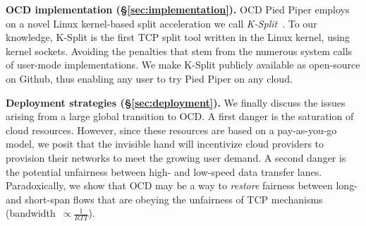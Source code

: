 \documentclass[newfonts=false,format=sigconf,anonymous,10pt,letterpaper]{acmart}
\newcommand{\T}[1]{\smallskip\noindent\textbf{#1}} %
\newcommand{\name}{Pied Piper\xspace}
\newcommand{\ksplit}{K-Split\xspace}
\begin{document}
\T{OCD implementation (\S\ref{sec:implementation}).} OCD \name employs on a novel Linux kernel-based split acceleration we call \textit{\ksplit}~\cite{ktcp}. To our knowledge, \ksplit is the first TCP split tool written in the Linux kernel, using kernel sockets. Avoiding the penalties that stem from the numerous system calls of user-mode implementations. We make \ksplit publicly available as open-source on Github, thus enabling any user to try \name on any cloud. 

\T{Deployment strategies (\S\ref{sec:deployment}).} We finally discuss the issues arising from a large global transition to OCD. A first danger is the saturation of cloud resources. However, since these resources are based on a pay-as-you-go model, we posit that the invisible hand will incentivize cloud providers to provision their networks to meet the growing user demand.  
A second danger is the potential unfairness between high- and low-speed data transfer lanes. Paradoxically, we show that OCD may be a way to \textit{restore} fairness between long- and short-span flows that are obeying the unfairness of TCP mechanisms (bandwidth~$\propto \frac{1}{RTT}$).%
\end{document}
